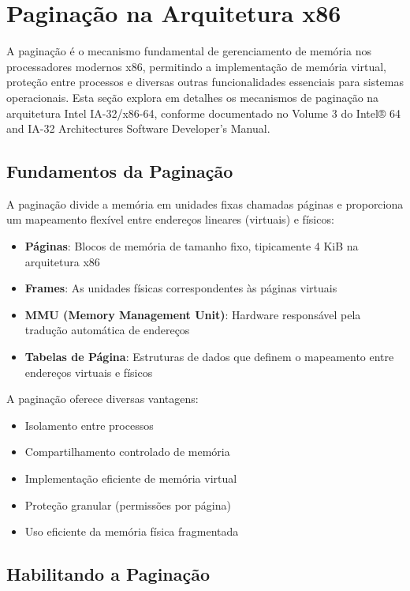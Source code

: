 \section{Paginação na Arquitetura x86}
\label{sec:b04_paginacao}

A paginação é o mecanismo fundamental de gerenciamento de memória nos processadores modernos x86, permitindo a implementação de memória virtual, proteção entre processos e diversas outras funcionalidades essenciais para sistemas operacionais. Esta seção explora em detalhes os mecanismos de paginação na arquitetura Intel IA-32/x86-64, conforme documentado no Volume 3 do Intel® 64 and IA-32 Architectures Software Developer's Manual.

\subsection{Fundamentos da Paginação}
\label{subsec:fundamentos_paginacao}

A paginação divide a memória em unidades fixas chamadas páginas e proporciona um mapeamento flexível entre endereços lineares (virtuais) e físicos:

\begin{itemize}
    \item \textbf{Páginas}: Blocos de memória de tamanho fixo, tipicamente 4 KiB na arquitetura x86
    \item \textbf{Frames}: As unidades físicas correspondentes às páginas virtuais
    \item \textbf{MMU (Memory Management Unit)}: Hardware responsável pela tradução automática de endereços
    \item \textbf{Tabelas de Página}: Estruturas de dados que definem o mapeamento entre endereços virtuais e físicos
\end{itemize}

A paginação oferece diversas vantagens:
\begin{itemize}
    \item Isolamento entre processos
    \item Compartilhamento controlado de memória
    \item Implementação eficiente de memória virtual
    \item Proteção granular (permissões por página)
    \item Uso eficiente da memória física fragmentada
\end{itemize}

\subsection{Habilitando a Paginação}
\label{subsec:habilitar_paginacao}

